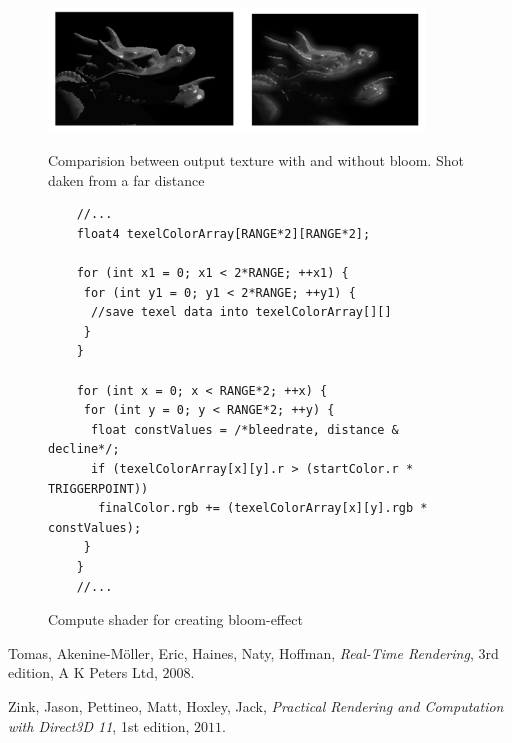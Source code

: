 \documentclass[a4paper,11pt]{article}
\begin{document}
\begin{figure}[ht!]
	\begin{center}
		\label{fin}
		\includegraphics[width=10cm]{pic/glowComparison.jpg}
		\caption{Comparision between output texture with and without bloom. Shot daken from a far distance}
	\end{center}
\end{figure}

\begin{figure}[ht!]
\begin{lstlisting}
	//...
	float4 texelColorArray[RANGE*2][RANGE*2];
	
	for (int x1 = 0; x1 < 2*RANGE; ++x1) {
	 for (int y1 = 0; y1 < 2*RANGE; ++y1) {
	  //save texel data into texelColorArray[][]
	 }
	}
	
	for (int x = 0; x < RANGE*2; ++x) {
	 for (int y = 0; y < RANGE*2; ++y) {
	  float constValues = /*bleedrate, distance & decline*/;
	  if (texelColorArray[x][y].r > (startColor.r * TRIGGERPOINT))
	   finalColor.rgb += (texelColorArray[x][y].rgb * constValues);
	 }
	}
	//...
\end{lstlisting}
\caption{Compute shader for creating bloom-effect}
\end{figure}

\newpage
\begin{thebibliography}{3}

		 Tomas, Akenine-Möller, Eric, Haines, Naty, Hoffman, \textit{Real-Time Rendering}, 3rd edition, A K Peters Ltd, $2008$.
		
		 Zink, Jason, Pettineo, Matt, Hoxley, Jack, \textit{Practical Rendering and Computation with Direct3D 11}, 1st edition, $2011$.
		
\end{thebibliography}
\end{document}
